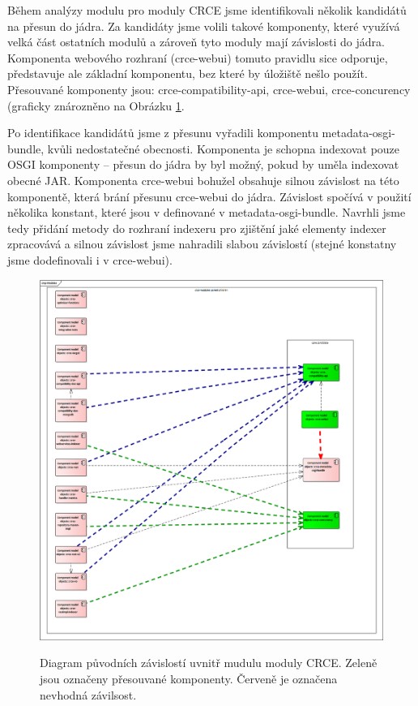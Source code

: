 \documentclass[12pt, a4paper]{article}
\begin{document}
Během analýzy modulu pro moduly CRCE jsme identifikovali několik kandidátů na přesun do jádra. Za kandidáty jsme volili takové komponenty, které využívá velká část ostatních modulů a zároveň tyto moduly mají závislosti do jádra.  Komponenta webového rozhraní (crce-webui) tomuto pravidlu sice odporuje, představuje ale základní komponentu, bez které by úložiště nešlo použít. Přesouvané komponenty jsou: crce-compatibility-api, crce-webui, crce-concurency (graficky znározněno na Obrázku \ref{fig:modulesCRCE}. 

Po identifikace kandidátů jsme z přesunu vyřadili komponentu metadata-osgi-bundle, kvůli nedostatečné obecnosti. Komponenta je schopna indexovat pouze OSGI komponenty -- přesun do jádra by byl možný, pokud by uměla indexovat obecné JAR. Komponenta crce-webui bohužel obsahuje silnou závislost na této komponentě, která brání přesunu crce-webui do jádra. Závislost spočívá v použití několika konstant, které jsou v definované v metadata-osgi-bundle. Navrhli jsme tedy přidání metody do rozhraní indexeru pro zjištění jaké elementy indexer zpracovává a silnou závislost jsme nahradili slabou závislostí (stejné konstatny jsme dodefinovali i v crce-webui).

\begin{figure}[h!]
\centering
\includegraphics[width=135mm]{modules.png}
\label{fig:modulesCRCE}
\caption{Diagram původních závislostí uvnitř mudulu moduly CRCE. Zeleně jsou označeny přesouvané komponenty. Červeně je označena nevhodná závilsost.}
\end{figure}
\end{document}
